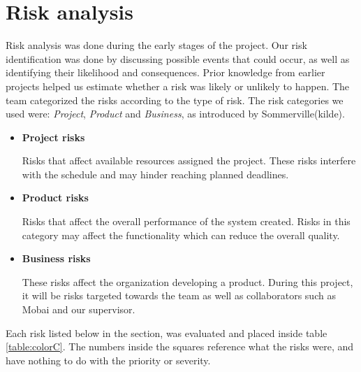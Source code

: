 \section{Risk analysis} 
Risk analysis was done during the early stages of the project. Our risk identification was done by discussing possible events that could occur, as well as identifying their likelihood and consequences. Prior knowledge from earlier projects helped us estimate whether a risk was likely or unlikely to happen. The team categorized the risks according to the type of risk. The risk categories we used were: \textit{Project}, \textit{Product} and \textit{Business}, as introduced by Sommerville(kilde). 

\begin{itemize}
    \item \textbf{Project risks} 
        \par Risks that affect available resources assigned the project. These risks interfere with the schedule and may hinder reaching planned deadlines. 
    \item \textbf{Product risks} 
        \par Risks that affect the overall performance of the system created. Risks in this category may affect the functionality which can reduce the overall quality. 
    \item \textbf{Business risks}
        \par These risks affect the organization developing a product. During this project, it will be risks targeted towards the team as well as collaborators such as Mobai and our supervisor. 
\end{itemize}

Each risk listed below in the section, was evaluated and placed inside table \ref{table:colorC}. The numbers inside the squares reference what the risks were, and have nothing to do with the priority or severity. 
    
